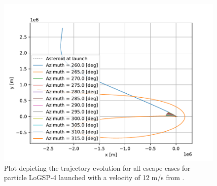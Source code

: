 \FloatBarrier
\begin{figure}[htb]
\centering
\captionsetup{justification=centering}
\includegraphics[width=\textwidth, height=0.4\textheight, keepaspectratio=true]{leading_edge_perturbations/logsp4_escape_traj_12ms_solarPhase225.pdf}
\caption{Plot depicting the trajectory evolution for all escape cases for particle LoGSP-4 launched with a velocity of 12 m/s from \protect{}.}
\label{fig:leadingEdge_logsp4_escape_traj_12ms_solar225}
\end{figure}
\FloatBarrier


